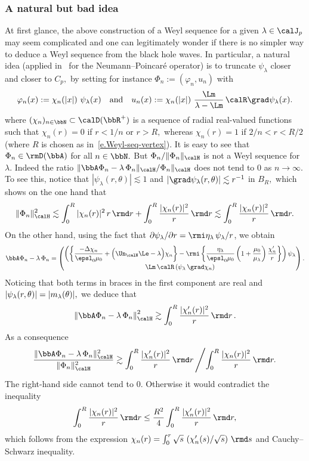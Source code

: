 \subsubsection{A natural but bad idea}
At first glance, the above construction of a Weyl sequence for a given $\lambda \in \calJ_p$ may seem complicated and one can legitimately wonder if there is no simpler way to deduce a Weyl sequence from the black hole waves. In particular, a natural idea (applied in~\cite{Bon-Zha-17} for the Neumann--Poincaré operator) is to truncate $\psi_\lambda$ closer and closer to $C_p,$ by setting for instance $\Phi_n := (\varphi_n,u_n)$ with
\[
\varphi_n(x) := \chi_n(|x|)\ \psi_\lambda(x)
\quad\text{and}\quad u_n(x) := \chi_n(|x|)\ \frac{\Lm}{\lambda-\Lm}\,\calR \grad\psi_\lambda(x).
\]
where $(\chi_n)_{n \in \bbN} \subset \calD(\bbR^+)$ is a sequence of radial real-valued functions such that $\chi_n(r) = 0$ if $r < 1/n$ or $r > R,$ whereas $\chi_n(r) = 1$ if $2/n < r < R/2$ (where $R$ is chosen as in~\eqref{e.Weyl-seq-vertex}). It is easy to see that $\Phi_n \in \rmD(\bbA)$ for all $n \in \bbN.$ But $ \Phi_n/\|\Phi_n\|_\calH$ is not a Weyl sequence for $\lambda.$ Indeed the ratio $\|\bbA \Phi_n - \lambda\, \Phi_n\|_\calH/\Phi_n\|_\calH$ does not tend to 0 as $n \to \infty.$ To see this, notice that $|\psi_\lambda(r,\theta)| \lesssim 1$ and $|\grad\psi_\lambda(r,\theta)| \lesssim r^{-1}$ in $B_R,$ which shows on the one hand that
\[
\| \Phi_n \|_\calH^2 \lesssim \int_0^R |\chi_n(r)|^2 \,r\,\rmd r + \int_0^R \frac{|\chi_n(r)|^2}{r} \,\rmd r
\lesssim \int_0^R \frac{|\chi_n(r)|^2}{r} \,\rmd r.
\]
On the other hand, using the fact that $\partial \psi_\lambda/\partial r = \rmi\eta_\lambda \,\psi_\lambda/r$, we obtain
\[
\bbA \Phi_n - \lambda\, \Phi_n =
\begin{pmatrix}
\displaystyle
\left(
\left\{ \frac{-\Delta \chi_n}{\epsl_0 \mu_0} + \Big(\Un_\calN\Le - \lambda \Big)\chi_n \right\} -\rmi\left\{\frac{\eta_\lambda}{\epsl_0 \mu_0} \left(1 + \frac{\mu_0}{\mu_\lambda}\right) \frac{\chi'_n}{r} \right\}
\right) \psi_\lambda \\[8pt]
\Lm\,\calR\left(\psi_\lambda \,\grad\chi_n \right)
\end{pmatrix}.
\]
Noticing that both terms in braces in the first component are real and $|\psi_\lambda(r,\theta)|\linebreak= |m_\lambda(\theta)|,$ we deduce that
\[
\left\| \bbA \Phi_n - \lambda\, \Phi_n \right\|_\calH^2 \gtrsim \int_0^R \frac{|\chi'_n(r)|^2}{r} \,\rmd r\,.
\]
As a consequence
\[
\frac{\| \bbA \Phi_n - \lambda\, \Phi_n \|_\calH^2}{\| \Phi_n \|_\calH^2}
\gtrsim \int_0^R \frac{|\chi'_n(r)|^2}{r} \,\rmd r
\left/ \int_0^R \frac{|\chi_n(r)|^2}{r} \,\rmd r. \right.
\]
The right-hand side cannot tend to 0. Otherwise it would contradict the inequality
\[
\int_0^R \frac{|\chi_n(r)|^2}{r} \,\rmd r
\leq \frac{R^2}{4} \int_0^R \frac{|\chi'_n(r)|^2}{r} \,\rmd r,
\]
which follows from the expression $\chi_n(r) = \int_0^r \sqrt{s} \,\left(\chi'_n(s)/\sqrt{s}\right)\,\rmd s$ and Cauchy--Schwarz inequality.

